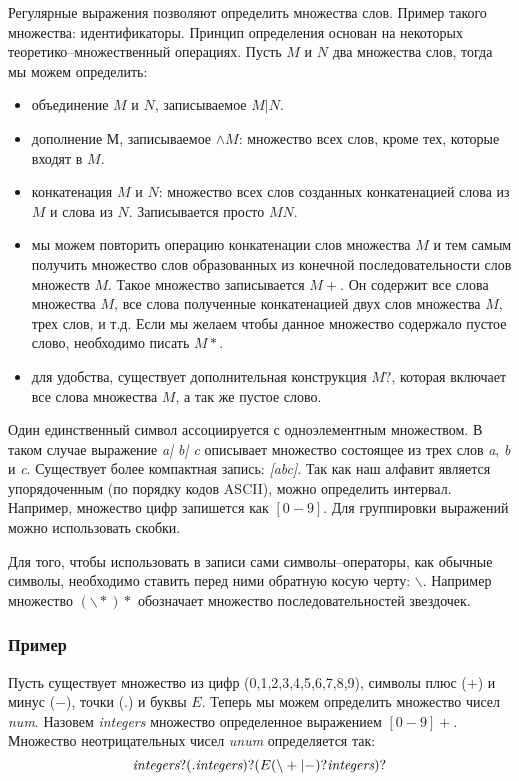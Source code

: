 Регулярные выражения позволяют определить множества слов. Пример такого
множества: идентификаторы. Принцип определения основан на некоторых
теоретико–множественный операциях. Пусть $M$ и $N$ два множества слов, тогда мы
можем определить:

\begin{itemize}
	\item объединение $M$ и $N$, записываемое $M | N$.

	\item дополнение $М$, записываемое $\wedge M$: множество всех слов, кроме
тех, которые входят в $M$.

	\item конкатенация $M$ и $N$: множество всех слов созданных конкатенацией
слова из $M$ и слова из $N$. Записывается просто $MN$.

	\item мы можем повторить операцию конкатенации слов множества $M$ и тем
самым получить множество слов образованных из конечной последовательности слов
множеств $M$. Такое множество записывается $M+$. Он содержит все слова множества
$M$, все слова полученные конкатенацией двух слов множества $M$, трех слов, и
т.д. Если мы желаем чтобы данное множество содержало пустое слово, необходимо
писать $M*$.

	\item для удобства, существует дополнительная конструкция $M?$, которая
включает все слова множества $M$, а так же пустое слово.
\end{itemize}

Один единственный символ ассоциируется с одноэлементным множеством. В таком
случае выражение {\it a| b| c} описывает множество состоящее из трех слов
{\it a}, {\it b} и {\it c}. Существует более компактная запись: {\it [abc]}.
Так как наш алфавит является упорядоченным (по порядку кодов ASCII), можно
определить интервал. Например, множество цифр запишется как $[0-9]$. Для
группировки выражений можно использовать скобки.

Для того, чтобы использовать в записи сами символы–операторы, как обычные
символы, необходимо ставить перед ними обратную косую черту: $\backslash$.
Например множество $(\backslash *)*$ обозначает множество последовательностей
звездочек.

\subsubsection{Пример}

Пусть существует множество из цифр (0,1,2,3,4,5,6,7,8,9), символы плюс ($+$) и
минус ($-$), точки ($.$) и буквы $E$. Теперь мы можем определить множество чисел
{\it num}. Назовем {\it integers} множество определенное выражением $[0-9]+$.
Множество неотрицательных чисел {\it unum} определяется так:
$$
	\text{\it integers} ? (.\text{\it integers}) ? (E(\backslash+|-) ? \\
\text{\it integers})?
$$

